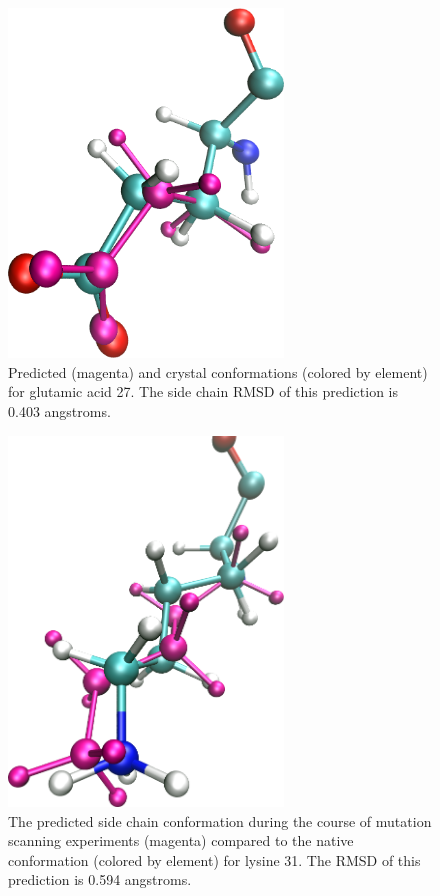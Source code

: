\begin{figure}[h]
  \centering
  \includegraphics[width=0.65\textwidth,height=0.3\textheight,keepaspectratio]{figures/mutation_side_chain_images/1fcc_27.png}
  \caption{Predicted (magenta) and crystal conformations (colored by element) for glutamic acid 27.
The side chain RMSD of this prediction is 0.403 angstroms.}
  \label{figure:computational_mutation_scanning/1FCC_27}
\end{figure}

\begin{figure}[h]
  \centering
  \includegraphics[width=0.65\textwidth,height=0.3\textheight,keepaspectratio]{figures/mutation_side_chain_images/1fcc_31.png}
  \caption{The predicted side chain conformation during the course of mutation scanning experiments (magenta) compared to the native conformation (colored by element) for lysine 31.
The RMSD of this prediction is 0.594 angstroms.}
  \label{figure:computational_mutation_scanning/1FCC_31}
\end{figure}

